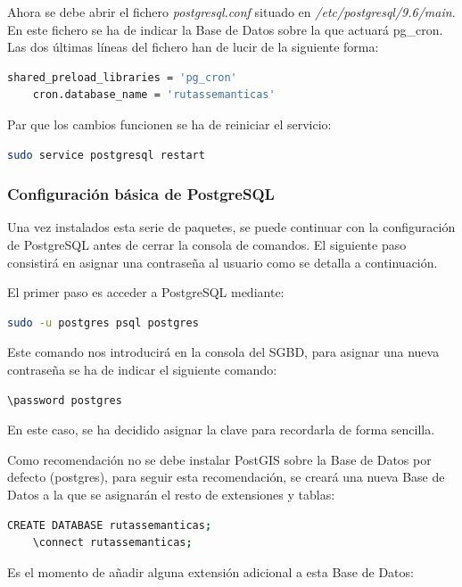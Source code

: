Ahora se debe abrir el fichero \textit{postgresql.conf} situado en \textit{/etc/postgresql/9.6/main}. En este fichero se ha de indicar la Base de Datos sobre la que actuará pg\_cron. Las dos últimas líneas del fichero han de lucir de la siguiente forma:
\begin{lstlisting}[language=bash]
	shared_preload_libraries = 'pg_cron'
	cron.database_name = 'rutassemanticas'
\end{lstlisting}

Par que los cambios funcionen se ha de reiniciar el servicio:
\begin{lstlisting}[language=bash]
	sudo service postgresql restart
\end{lstlisting}

\subsubsection{Configuración básica de PostgreSQL}

Una vez instalados esta serie de paquetes, se puede continuar con la configuración de PostgreSQL antes de cerrar la consola de comandos. El siguiente paso consistirá en asignar una contraseña al usuario   como se detalla a continuación.

El primer paso es acceder a PostgreSQL mediante:
\begin{lstlisting}[language=bash]
	sudo -u postgres psql postgres
\end{lstlisting}
Este comando nos introducirá en la consola del SGBD, para asignar una nueva contraseña se ha de indicar el siguiente comando:

\begin{lstlisting}[language=bash]
	\password postgres
\end{lstlisting}

En este caso, se ha decidido asignar la clave  para recordarla de forma sencilla.

Como recomendación no se debe instalar PostGIS sobre la Base de Datos por defecto (postgres), para seguir esta recomendación, se creará una nueva Base de Datos a la que se asignarán el resto de extensiones y tablas:

\begin{lstlisting}[language=bash]
	CREATE DATABASE rutassemanticas;
	\connect rutassemanticas;
\end{lstlisting}

Es el momento de añadir alguna extensión adicional a esta Base de Datos:

